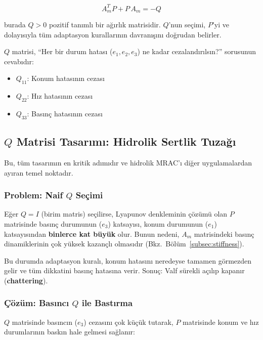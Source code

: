 \documentclass[12pt,a4paper]{article}
\begin{document}
\begin{equation}
    \boxed{A_m^T P + P\,A_m = -Q}
    \label{eq:lyapunov_eq}
\end{equation}

burada $Q > 0$ pozitif tanımlı bir ağırlık matrisidir. $Q$'nun seçimi, $P$'yi ve dolayısıyla tüm adaptasyon kurallarının davranışını doğrudan belirler.

\begin{kavram}
$Q$ matrisi, ``Her bir durum hatası ($e_1, e_2, e_3$) ne kadar cezalandırılsın?'' sorusunun cevabıdır:
\begin{itemize}
    \item $Q_{11}$: Konum hatasının cezası
    \item $Q_{22}$: Hız hatasının cezası
    \item $Q_{33}$: Basınç hatasının cezası
\end{itemize}
\end{kavram}

\subsection{$Q$ Matrisi Tasarımı: Hidrolik Sertlik Tuzağı}
\label{subsec:Q_design}

Bu, tüm tasarımın en kritik adımıdır ve hidrolik MRAC'ı diğer uygulamalardan ayıran temel noktadır.

\subsubsection{Problem: Naif $Q$ Seçimi}
Eğer $Q = I$ (birim matris) seçilirse, Lyapunov denkleminin çözümü olan $P$ matrisinde basınç durumunun ($e_3$) katsayısı, konum durumunun ($e_1$) katsayısından \textbf{binlerce kat büyük} olur. Bunun nedeni, $A_m$ matrisindeki basınç dinamiklerinin çok yüksek kazançlı olmasıdır (Bkz.\ B\"ol\"um~\ref{subsec:stiffness}).

Bu durumda adaptasyon kuralı, konum hatasını neredeyse tamamen görmezden gelir ve tüm dikkatini basınç hatasına verir. Sonuç: Valf sürekli açılıp kapanır (\textbf{chattering}).

\subsubsection{Çözüm: Basıncı $Q$ ile Bastırma}
\label{subsubsec:Q_solution}

$Q$ matrisinde basıncın ($e_3$) cezasını çok küçük tutarak, $P$ matrisinde konum ve hız durumlarının baskın hale gelmesi sağlanır:
\end{document}
